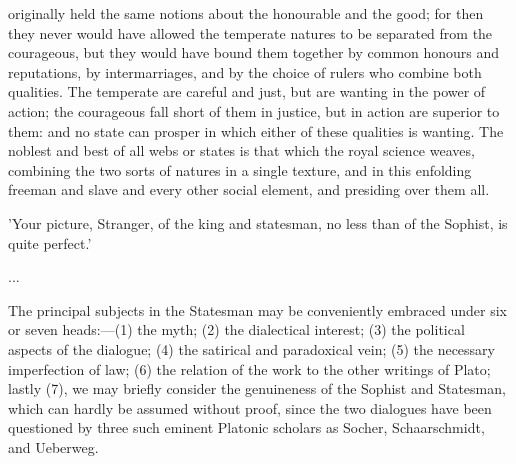\documentclass[11pt,letter]{article}
\begin{document}
originally held the same notions about the honourable and the good; for then they never would have allowed the temperate natures to be separated from the courageous, but they would have bound them together by common honours and reputations, by intermarriages, and by the choice of rulers who combine both qualities. The temperate are careful and just, but are wanting in the power of action; the courageous fall short of them in justice, but in action are superior to them: and no state can prosper in which either of these qualities is wanting. The noblest and best of all webs or states is that which the royal science weaves, combining the two sorts of natures in a single texture, and in this enfolding freeman and slave and every other social element, and presiding over them all.

\par  'Your picture, Stranger, of the king and statesman, no less than of the Sophist, is quite perfect.'

\par  ...

\par  The principal subjects in the Statesman may be conveniently embraced under six or seven heads:—(1) the myth; (2) the dialectical interest; (3) the political aspects of the dialogue; (4) the satirical and paradoxical vein; (5) the necessary imperfection of law; (6) the relation of the work to the other writings of Plato; lastly (7), we may briefly consider the genuineness of the Sophist and Statesman, which can hardly be assumed without proof, since the two dialogues have been questioned by three such eminent Platonic scholars as Socher, Schaarschmidt, and Ueberweg.
\end{document}
